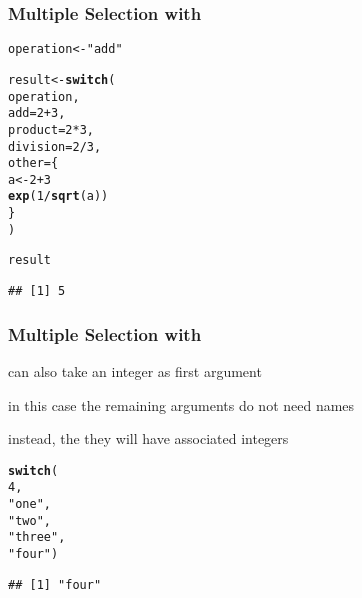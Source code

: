 \documentclass[12pt]{beamer}\usepackage[]{graphicx}\usepackage[]{color}
\makeatletter
\newcommand{\hlnum}[1]{\textcolor[rgb]{0.686,0.059,0.569}{#1}}%
\newcommand{\hlstr}[1]{\textcolor[rgb]{0.192,0.494,0.8}{#1}}%
\newcommand{\hlopt}[1]{\textcolor[rgb]{0,0,0}{#1}}%
\newcommand{\hlstd}[1]{\textcolor[rgb]{0.345,0.345,0.345}{#1}}%
\newcommand{\hlkwb}[1]{\textcolor[rgb]{0.69,0.353,0.396}{#1}}%
\newcommand{\hlkwc}[1]{\textcolor[rgb]{0.333,0.667,0.333}{#1}}%
\newcommand{\hlkwd}[1]{\textcolor[rgb]{0.737,0.353,0.396}{\textbf{#1}}}%
\newenvironment{kframe}{%
 \def\at@end@of@kframe{}%
 \ifinner\ifhmode%
  \def\at@end@of@kframe{\end{minipage}}%
  \begin{minipage}{\columnwidth}%
 \fi\fi%
 \def\FrameCommand##1{\hskip\@totalleftmargin \hskip-\fboxsep
 \colorbox{shadecolor}{##1}\hskip-\fboxsep
     \hskip-\linewidth \hskip-\@totalleftmargin \hskip\columnwidth}%
 \MakeFramed {\advance\hsize-\width
   \@totalleftmargin\z@ \linewidth\hsize
   \@setminipage}}%
 {\par\unskip\endMakeFramed%
 \at@end@of@kframe}
\newenvironment{knitrout}{}{} %
\makeatother
\begin{document}
\begin{frame}[fragile]
\frametitle{Multiple Selection with }

\begin{knitrout}\footnotesize
{}\color{fgcolor}\begin{kframe}
\begin{alltt}
\hlstd{operation} \hlkwb{<-} \hlstr{"add"}

\hlstd{result} \hlkwb{<-} \hlkwd{switch}\hlstd{(}
  \hlstd{operation,}
  \hlkwc{add} \hlstd{=} \hlnum{2} \hlopt{+} \hlnum{3}\hlstd{,}
  \hlkwc{product} \hlstd{=} \hlnum{2} \hlopt{*} \hlnum{3}\hlstd{,}
  \hlkwc{division} \hlstd{=} \hlnum{2} \hlopt{/} \hlnum{3}\hlstd{,}
  \hlkwc{other} \hlstd{= \{}
    \hlstd{a} \hlkwb{<-} \hlnum{2} \hlopt{+} \hlnum{3}
    \hlkwd{exp}\hlstd{(}\hlnum{1} \hlopt{/} \hlkwd{sqrt}\hlstd{(a))}
  \hlstd{\}}
\hlstd{)}

\hlstd{result}
\end{alltt}
\begin{verbatim}
## [1] 5
\end{verbatim}
\end{kframe}
\end{knitrout}

\end{frame}


\begin{frame}[fragile]
\frametitle{Multiple Selection with }

\bi
  \item {} can also take an integer as first argument
  \item in this case the remaining arguments do not need names
  \item instead, the they will have associated integers
\ei

\begin{knitrout}\footnotesize
{}\color{fgcolor}\begin{kframe}
\begin{alltt}
\hlkwd{switch}\hlstd{(}
  \hlnum{4}\hlstd{,}
  \hlstr{"one"}\hlstd{,}
  \hlstr{"two"}\hlstd{,}
  \hlstr{"three"}\hlstd{,}
  \hlstr{"four"}\hlstd{)}
\end{alltt}
\begin{verbatim}
## [1] "four"
\end{verbatim}
\end{kframe}
\end{knitrout}

\end{frame}
\end{document}
